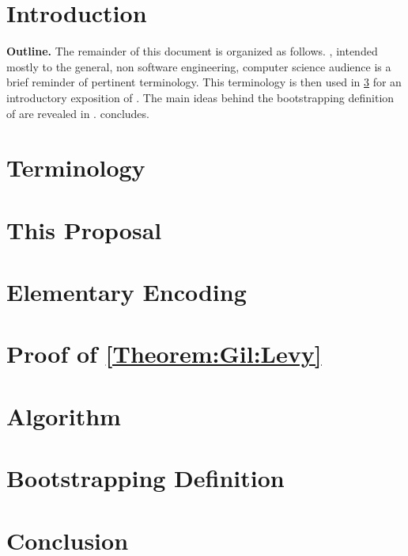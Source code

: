 \documentclass[a4paper,USenglish]{lipics}
\author{Anonymized for the submission}
\begin{document}
\maketitle
\begin{abstract}
	 
\end{abstract}



\section{Introduction}

\textbf{Outline.} 
The remainder of this document is organized as follows.
, intended mostly to the general, non software engineering, 
  computer science audience is a brief reminder of pertinent terminology.
This terminology is then used in \cref{Section:proposal} for 
  an introductory exposition of \Self.
The main ideas behind the bootstrapping definition of \Self 
  are revealed in . 
 concludes. 

\section{Terminology}
\label{Section:terminology}
%

\section{This Proposal}
\label{Section:proposal}
%

\section{Elementary Encoding}
\label{Section:elementary}


\section{Proof of \cref{Theorem:Gil:Levy}}
\label{Section:proof}
%

\section{Algorithm}
\label{Section:algorithm}
%

\section{Bootstrapping Definition}
\label{Section:bootstrapping}
%

\section{Conclusion}
\label{Section:zz}
%

\small
%

\end{document}
